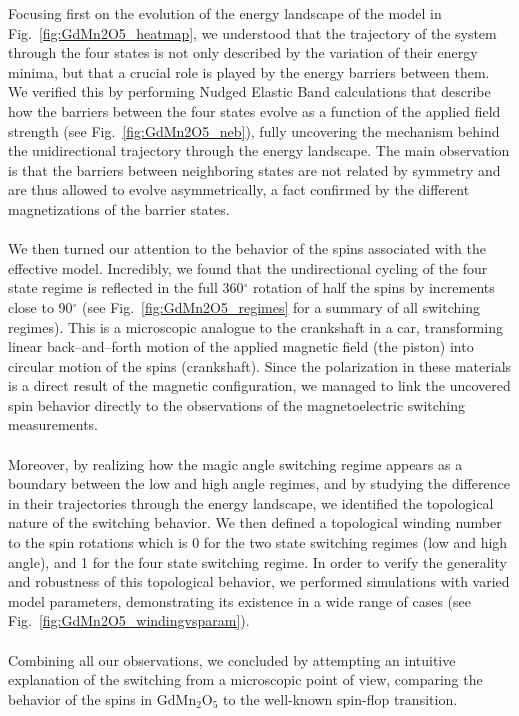 Focusing first on the evolution of the energy landscape of the model in Fig.~\ref{fig:GdMn2O5_heatmap}, we understood that the trajectory of the system through the four states is not only described by the variation of their energy minima, but that a crucial role is played by the energy barriers between them.
We verified this by performing Nudged Elastic Band calculations that describe how the barriers between the four states evolve as a function of the applied field strength (see Fig.~\ref{fig:GdMn2O5_neb}), fully uncovering the mechanism behind the unidirectional trajectory through the energy landscape.
The main observation is that the barriers between neighboring states are not related by symmetry and are thus allowed to evolve asymmetrically, a fact confirmed by the different magnetizations of the barrier states.
\\\\
We then turned our attention to the behavior of the spins associated with the effective model. Incredibly, we found that the undirectional cycling of the four state regime is reflected in the full 360$^\circ$ rotation of half the spins by increments close to 90$^\circ$ (see Fig.~\ref{fig:GdMn2O5_regimes} for a summary of all switching regimes).
This is a microscopic analogue to the crankshaft in a car, transforming linear back--and--forth motion of the applied magnetic field (the piston) into circular motion of the spins (crankshaft).
Since the polarization in these materials is a direct result of the magnetic configuration, we managed to link the uncovered spin behavior directly to the observations of the magnetoelectric switching measurements.
\\\\
Moreover, by realizing how the magic angle switching regime appears as a boundary between the low and high angle regimes, and by studying the difference in their trajectories through the energy landscape, we identified the topological nature of the switching behavior.
We then defined a topological winding number to the spin rotations which is 0 for the two state switching regimes (low and high angle), and 1 for the four state switching regime.
In order to verify the generality and robustness of this topological behavior, we performed simulations with varied model parameters, demonstrating its existence in a wide range of cases (see Fig.~\ref{fig:GdMn2O5_windingvsparam}).
\\\\
Combining all our observations, we concluded by attempting an intuitive explanation of the switching from a microscopic point of view, comparing the behavior of the spins in GdMn$_2$O$_5$ to the well-known spin-flop transition.
